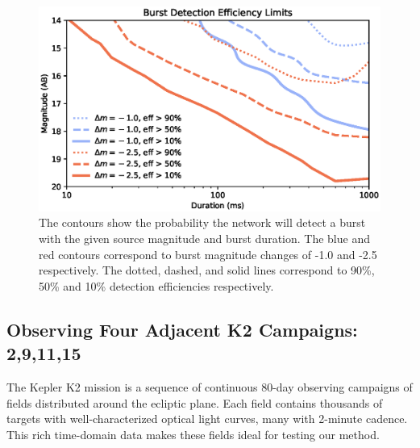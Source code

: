 \documentclass[11pt]{article}
\begin{document}
\begin{figure}[htb]
\center
\includegraphics[width=\columnwidth]{contour.eps}
\caption{The contours show the probability the network will detect a burst with the given source magnitude and burst duration. The blue and red contours correspond to burst magnitude changes of -1.0 and -2.5 respectively. The dotted, dashed, and solid lines correspond to 90\%, 50\% and 10\% detection efficiencies respectively.}
\label{fig:3}
\end{figure}


\clearpage

%

%

\expdesign
\subsection*{Observing Four Adjacent K2 Campaigns: 2,9,11,15}

The Kepler K2 mission is a sequence of continuous 80-day observing campaigns of fields distributed around the ecliptic plane. Each field contains thousands of targets with well-characterized optical light curves, many with 2-minute cadence. This rich time-domain data makes these fields ideal for testing our method.
\end{document}
